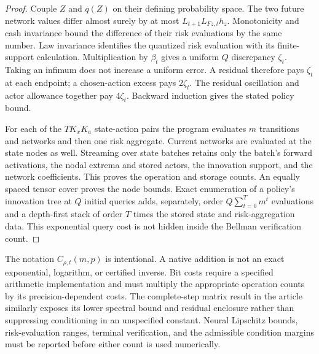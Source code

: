 \begin{proof}
Couple $Z$ and $q(Z)$ on their defining probability space. The two future
network values differ almost surely by at most
$L_{t+1}L_{Fz,t}h_z$. Monotonicity and cash invariance bound the difference
of their risk evaluations by the same number. Law invariance identifies
the quantized risk evaluation with its finite-support calculation.
Multiplication by $\beta_t$ gives a uniform $Q$ discrepancy $\zeta_t$.
Taking an infimum does not increase a uniform error. A residual therefore
pays $\zeta_t$ at each endpoint; a chosen-action excess pays $2\zeta_t$.
The residual oscillation and actor allowance together pay $4\zeta_t$.
Backward induction gives the stated policy bound.

For each of the $TK_xK_a$ state-action pairs the program evaluates $m$
transitions and networks and then one risk aggregate. Current networks
are evaluated at the state nodes as well. Streaming over state batches
retains only the batch's forward activations, the nodal extrema and stored
actors, the innovation support, and the network coefficients. This proves
the operation and storage counts. An equally spaced tensor cover proves
the node bounds. Exact enumeration of a policy's innovation tree at $Q$
initial queries adds, separately, order
$Q\sum_{t=0}^Tm^t$ evaluations and a depth-first stack of order $T$ times
the stored state and risk-aggregation data. This exponential query cost is
not hidden inside the Bellman verification count.
\end{proof}

The notation $C_{\rho,t}(m,p)$ is intentional. A native addition is not an
exact exponential, logarithm, or certified inverse. Bit costs require a
specified arithmetic implementation and must multiply the appropriate
operation counts by its precision-dependent costs. The complete-step
matrix result in the article similarly exposes its lower spectral bound
and residual enclosure rather than suppressing conditioning in an
unspecified constant. Neural Lipschitz bounds, risk-evaluation ranges,
terminal verification, and the admissible condition margins must be
reported before either count is used numerically.

